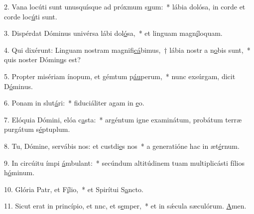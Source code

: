 2. Vana locúti sunt unusquísque ad próxmum s\uline{u}um:~* lábia dolósa, in corde et corde loc\uline{ú}ti sunt.\par 
3. Dispérdat Dóminus univérsa lábi dol\uline{ó}sa,~* et linguam magn\uline{í}loquam.\par 
4. Qui dixérunt: Linguam nostram magnifi\uline{cá}bimus,~† lábia nostr a n\uline{o}bis sunt,~* quis noster Dómin\uline{u}s est?\par 
5. Propter misériam ínopum, et gémtum p\uline{áu}perum,~* nunc exsúrgam, dicit D\uline{ó}minus.\par 
6. Ponam in slut\uline{á}ri:~* fiduciáliter agam in \uline{e}o.\par 
7. Elóquia Dómini, elóa c\uline{a}sta:~* argéntum igne examinátum, probátum terræ purgátum s\uline{é}ptuplum.\par 
8. Tu, Dómine, servábis nos: et custdi\uline{e}s nos~* a generatióne hac in æt\uline{é}rnum.\par 
9. In circúitu ímpi \uline{á}mbulant:~* secúndum altitúdinem tuam multiplicásti fílios h\uline{ó}minum.\par 
10. Glória Patr, et F\uline{í}lio,~* et Spirítui S\uline{a}ncto.\par 
11. Sicut erat in princípio, et nnc, et s\uline{e}mper,~* et in sǽcula sæculórum. \uline{A}men.\par 
